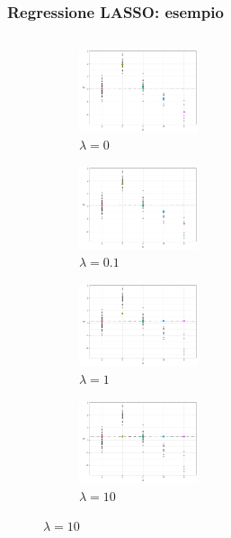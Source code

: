 \documentclass[pdf, aspectratio=169]{beamer}\usepackage[]{graphicx}\usepackage[]{color}
\theoremstyle{definition}
\begin{document}
\begin{frame}
\frametitle{Regressione LASSO: esempio}

\fontsize{9pt}{11pt}\selectfont

\begin{columns}[c]
\begin{column}{0.55\linewidth}
  \begin{figure}
    \centering
    \begin{subfigure}[b]{3cm}
      \centering
      \caption{$\lambda = 0$}
      \includegraphics[width=3.5cm]{_bookdown_files/_main_files/figure-latex/lasso-lambda-1.pdf}
    \end{subfigure}
    \qquad
    \begin{subfigure}[b]{3cm}
      \centering
      \caption{$\lambda = 0.1$}
      \includegraphics[width=3.5cm]{_bookdown_files/_main_files/figure-latex/lasso-lambda-2.pdf}
    \end{subfigure}
    \par\medskip
    \begin{subfigure}[b]{3cm}
      \centering
      \caption{$\lambda = 1$}
      \includegraphics[width=3.5cm]{_bookdown_files/_main_files/figure-latex/lasso-lambda-3.pdf}
    \end{subfigure}
    \qquad
    \begin{subfigure}[b]{3cm}
      \centering
      \caption{$\lambda = 10$}
      \includegraphics[width=3.5cm]{_bookdown_files/_main_files/figure-latex/lasso-lambda-4.pdf}

\end{subfigure}
\end{figure}
\end{column}
\end{columns}
\end{frame}
\end{document}
